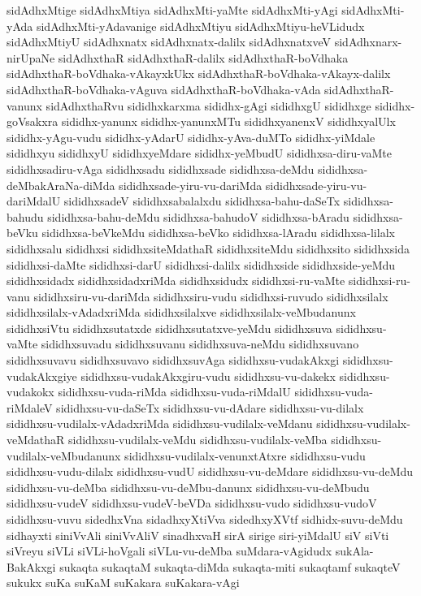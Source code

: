 {sidAdhxMtige
sidAdhxMtiya
sidAdhxMti-yaMte
sidAdhxMti-yAgi
sidAdhxMti-yAda
sidAdhxMti-yAdavanige
sidAdhxMtiyu
sidAdhxMtiyu-heVLidudx
sidAdhxMtiyU
sidAdhxnatx
sidAdhxnatx-dalilx
sidAdhxnatxveV
sidAdhxnarx-nirUpaNe
sidAdhxthaR
sidAdhxthaR-dalilx
sidAdhxthaR-boVdhaka
sidAdhxthaR-boVdhaka-vAkayxkUkx
sidAdhxthaR-boVdhaka-vAkayx-dalilx
sidAdhxthaR-boVdhaka-vAguva
sidAdhxthaR-boVdhaka-vAda
sidAdhxthaR-vanunx
sidAdhxthaRvu
sididhxkarxma
sididhx-gAgi
sididhxgU
sididhxge
sididhx-goVsakxra
sididhx-yanunx
sididhx-yanunxMTu
sididhxyanenxV
sididhxyalUlx
sididhx-yAgu-vudu
sididhx-yAdarU
sididhx-yAva-duMTo
sididhx-yiMdale
sididhxyu
sididhxyU
sididhxyeMdare
sididhx-yeMbudU
sididhxsa-diru-vaMte
sididhxsadiru-vAga
sididhxsadu
sididhxsade
sididhxsa-deMdu
sididhxsa-deMbakAraNa-diMda
sididhxsade-yiru-vu-dariMda
sididhxsade-yiru-vu-dariMdalU
sididhxsadeV
sididhxsabalalxdu
sididhxsa-bahu-daSeTx
sididhxsa-bahudu
sididhxsa-bahu-deMdu
sididhxsa-bahudoV
sididhxsa-bAradu
sididhxsa-beVku
sididhxsa-beVkeMdu
sididhxsa-beVko
sididhxsa-lAradu
sididhxsa-lilalx
sididhxsalu
sididhxsi
sididhxsiteMdathaR
sididhxsiteMdu
sididhxsito
sididhxsida
sididhxsi-daMte
sididhxsi-darU
sididhxsi-dalilx
sididhxside
sididhxside-yeMdu
sididhxsidadx
sididhxsidadxriMda
sididhxsidudx
sididhxsi-ru-vaMte
sididhxsi-ru-vanu
sididhxsiru-vu-dariMda
sididhxsiru-vudu
sididhxsi-ruvudo
sididhxsilalx
sididhxsilalx-vAdadxriMda
sididhxsilalxve
sididhxsilalx-veMbudanunx
sididhxsiVtu
sididhxsutatxde
sididhxsutatxve-yeMdu
sididhxsuva
sididhxsu-vaMte
sididhxsuvadu
sididhxsuvanu
sididhxsuva-neMdu
sididhxsuvano
sididhxsuvavu
sididhxsuvavo
sididhxsuvAga
sididhxsu-vudakAkxgi
sididhxsu-vudakAkxgiye
sididhxsu-vudakAkxgiru-vudu
sididhxsu-vu-dakekx
sididhxsu-vudakokx
sididhxsu-vuda-riMda
sididhxsu-vuda-riMdalU
sididhxsu-vuda-riMdaleV
sididhxsu-vu-daSeTx
sididhxsu-vu-dAdare
sididhxsu-vu-dilalx
sididhxsu-vudilalx-vAdadxriMda
sididhxsu-vudilalx-veMdanu
sididhxsu-vudilalx-veMdathaR
sididhxsu-vudilalx-veMdu
sididhxsu-vudilalx-veMba
sididhxsu-vudilalx-veMbudanunx
sididhxsu-vudilalx-venunxtAtxre
sididhxsu-vudu
sididhxsu-vudu-dilalx
sididhxsu-vudU
sididhxsu-vu-deMdare
sididhxsu-vu-deMdu
sididhxsu-vu-deMba
sididhxsu-vu-deMbu-danunx
sididhxsu-vu-deMbudu
sididhxsu-vudeV
sididhxsu-vudeV-beVDa
sididhxsu-vudo
sididhxsu-vudoV
sididhxsu-vuvu
sidedhxVna
sidadhxyXtiVva
sidedhxyXVtf
sidhidx-suvu-deMdu
sidhayxti
siniVvAli
siniVvAliV
sinadhxvaH
sirA
sirige
siri-yiMdalU
siV
siVti
siVreyu
siVLi
siVLi-hoVgali
siVLu-vu-deMba
suMdara-vAgidudx
sukAla-BakAkxgi
sukaqta
sukaqtaM
sukaqta-diMda
sukaqta-miti
sukaqtamf
sukaqteV
sukukx
suKa
suKaM
suKakara
suKakara-vAgi
}

